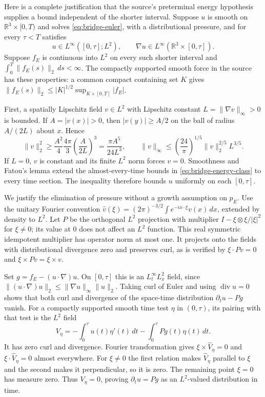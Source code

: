 Here is a complete justification that the source's preterminal energy
hypothesis supplies a bound independent of the shorter interval.  Suppose
$u$ is smooth on $\mathbb R^3\times[0,T)$ and solves
\eqref{eq:bridge-euler}, with a distributional pressure, and for every
$\tau<T$ satisfies
\begin{equation}\label{eq:bridge-energy-class}
 u\in L^\infty([0,\tau];L^2),\qquad
 \nabla u\in L^\infty(\mathbb R^3\times[0,\tau]).
\end{equation}
Suppose $f_E$ is continuous into $L^2$ on every such shorter interval and
$\int_0^T\|f_E(s)\|_2\,ds<\infty$.  The compactly supported smooth
force in the source has these properties: a common compact containing set
$K$ gives
$\|f_E(s)\|_2\le |K|^{1/2}\sup_{K\times[0,T]}|f_E|$.

First, a spatially Lipschitz field $v\in L^2$ with Lipschitz constant
$L=\|\nabla v\|_\infty>0$ is bounded.  If $A=|v(x)|>0$, then
$|v(y)|\ge A/2$ on the ball of radius $A/(2L)$ about $x$.  Hence
\[
 \|v\|_2^2\ge \frac{A^2}{4}\frac{4\pi}{3}
                    \left(\frac{A}{2L}\right)^3
       =\frac{\pi A^5}{24L^3},\qquad
 \|v\|_\infty\le
       \left(\frac{24}{\pi}\right)^{1/5}\|v\|_2^{2/5}L^{3/5}.
\]
If $L=0$, $v$ is constant and its finite $L^2$ norm forces $v=0$.
Smoothness and Fatou's lemma extend the almost-every-time bounds in
\eqref{eq:bridge-energy-class} to every time section.  The inequality
therefore bounds $u$ uniformly on each $[0,\tau]$.

We justify the elimination of pressure without a growth assumption on
$p_E$.  Use the unitary Fourier convention
$\widehat v(\xi)=(2\pi)^{-3/2}\int e^{-ix\cdot\xi}v(x)\,dx$,
extended by density to $L^2$.  Let $P$ be the orthogonal $L^2$ projection
with multiplier
$I-\xi\otimes\xi/|\xi|^2$ for $\xi\ne0$; its value at $0$ does not
affect an $L^2$ function.  This real symmetric idempotent multiplier has
operator norm at most one.  It projects onto the fields with
distributional divergence zero and preserves curl, as is verified by
$\xi\cdot Pv=0$ and $\xi\times Pv=\xi\times v$.

Set $g=f_E-(u\cdot\nabla)u$.  On $[0,\tau]$ this is an $L^\infty_tL^2_x$
field, since
$\|(u\cdot\nabla)u\|_2\le\|\nabla u\|_\infty\|u\|_2$.
Taking curl of Euler and using $\operatorname{div}u=0$ shows that
both curl and divergence of the space-time distribution
$\partial_tu-Pg$ vanish.  For a compactly supported smooth time test
$\eta$ in $(0,\tau)$, its pairing with that test is the $L^2$ field
\[
 V_\eta=-\int_0^\tau u(t)\eta'(t)\,dt
             -\int_0^\tau Pg(t)\eta(t)\,dt.
\]
It has zero curl and divergence.  Fourier transformation gives
$\xi\times\widehat V_\eta=0$ and
$\xi\cdot\widehat V_\eta=0$ almost everywhere.  For $\xi\ne0$ the
first relation makes $\widehat V_\eta$ parallel to $\xi$ and the second
makes it perpendicular, so it is zero.  The remaining point $\xi=0$
has measure zero.  Thus $V_\eta=0$, proving
$\partial_tu=Pg$ as an $L^2$-valued distribution in time.

